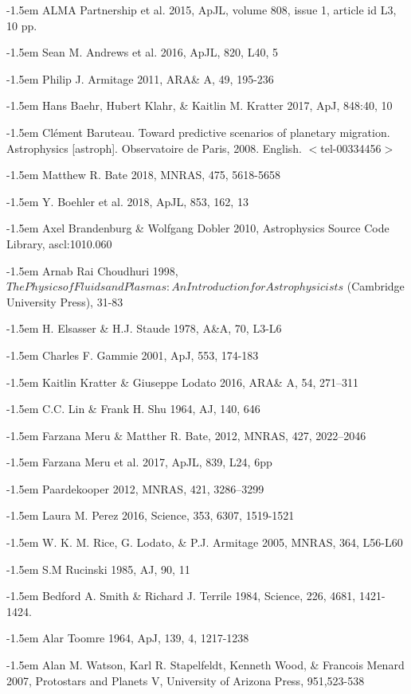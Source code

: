 \documentclass[onecolumn]{report}
\makeatletter
\def\bibindent{1.5em}
\let\old@bibitem\bibitem
\def\bibitem#1{\old@bibitem{#1}\leavevmode\kern-\bibindent}
\makeatother
\begin{document}
\clearpage
{}
\singlespacing
\begin{thebibliography}{}

ALMA Partnership et al. 2015, ApJL, volume 808, issue 1, article id L3, 10 pp.

Sean M. Andrews et al. 2016, ApJL, 820, L40, 5

Philip J. Armitage 2011, ARA\& A, 49, 195-236

Hans Baehr, Hubert Klahr, \& Kaitlin M. Kratter 2017, ApJ, 848:40, 10

Cl\'ement Baruteau. Toward predictive scenarios of planetary migration. Astrophysics [astroph].
Observatoire de Paris, 2008. English. $<$tel-00334456$>$

Matthew R. Bate 2018, MNRAS, 475, 5618-5658

Y. Boehler et al. 2018, ApJL, 853, 162, 13

Axel Brandenburg \& Wolfgang Dobler 2010, Astrophysics Source Code Library, ascl:1010.060

Arnab Rai Choudhuri 1998, $The Physics of Fluids and Plasmas: An Introduction for Astrophysicists$ (Cambridge University Press), 31-83

H. Elsasser \& H.J. Staude 1978, A\&A, 70, L3-L6

Charles F. Gammie 2001, ApJ, 553, 174-183

Kaitlin Kratter \& Giuseppe Lodato 2016, ARA\& A, 54, 271–311

C.C. Lin \& Frank H. Shu 1964, AJ, 140, 646

Farzana Meru \& Matther R. Bate, 2012, MNRAS, 427, 2022–2046

Farzana Meru et al. 2017, ApJL, 839, L24, 6pp

Paardekooper 2012, MNRAS, 421, 3286–3299

Laura M. Perez 2016, Science, 353, 6307, 1519-1521

W. K. M. Rice, G. Lodato, \& P.J. Armitage 2005, MNRAS, 364, L56-L60

S.M Rucinski 1985, AJ, 90, 11

Bedford A. Smith \& Richard J. Terrile 1984, Science, 226, 4681, 1421-1424.

Alar Toomre 1964, ApJ, 139, 4, 1217-1238

Alan M. Watson, Karl R. Stapelfeldt, Kenneth Wood, \& Francois Menard 2007, Protostars and Planets V, University of Arizona Press, 951,523-538

\end{thebibliography}
\end{document}
